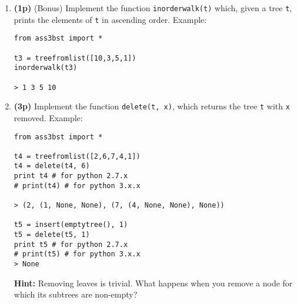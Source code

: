 \documentclass{article}
\begin{document}
\begin{enumerate}

\item
{\bf (1p)}
(Bonus) Implement the function \lstinline{inorderwalk(t)} which, given a tree \lstinline{t}, 
prints the elements of \lstinline{t} in ascending order. Example:

\begin{lstlisting}
from ass3bst import *

t3 = treefromlist([10,3,5,1])
inorderwalk(t3)

> 1 3 5 10
\end{lstlisting}

\item
{\bf (3p)}
Implement the function \lstinline{delete(t, x)}, which returns the tree  \lstinline{t} with \lstinline{x} removed. Example: 

\begin{lstlisting}
from ass3bst import *

t4 = treefromlist([2,6,7,4,1])
t4 = delete(t4, 6)
print t4 # for python 2.7.x
# print(t4) # for python 3.x.x

> (2, (1, None, None), (7, (4, None, None), None))

t5 = insert(emptytree(), 1)
t5 = delete(t5, 1)
print t5 # for python 2.7.x
# print(t5) # for python 3.x.x
> None
\end{lstlisting}
%
{\bf Hint:} Removing leaves is trivial. What happens when you remove a node for which its subtrees are non-empty?
\end{enumerate}
\end{document}

